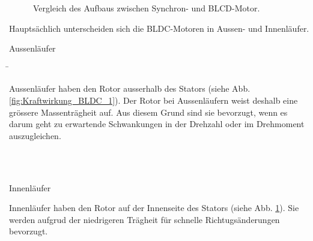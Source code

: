 \begin{figure}[h!]
\centering
\hspace{3cm}
%
\hfill
{}%
\hfill
\hspace{3cm}
\caption{Vergleich des Aufbaus zwischen Synchron- und BLCD-Motor.}
\label{fig:Aufbau_Synchron_und_BLDC}
\end{figure}

Hauptsächlich unterscheiden sich die BLDC-Motoren in Aussen- und Innenläufer.

\begin{tabbing}
\parbox[t]{.25\textwidth}{Aussenläufer} \= \parbox[t]{.75\textwidth}{Aussenläufer haben den Rotor ausserhalb des Stators (siehe Abb. \ref{fig:Kraftwirkung_BLDC_1}). Der Rotor bei Aussenläufern weist deshalb eine grössere Massenträgheit auf. Aus diesem Grund sind sie bevorzugt, wenn es darum geht zu erwartende Schwankungen in der Drehzahl oder im Drehmoment auszugleichen. \cite{bruner_burstenloser_2016} \cite{hembach_systematischer_2007}}\\
\\
\parbox[t]{.25\textwidth}{Innenläufer} \>\parbox[t]{.75\textwidth}{Innenläufer haben den Rotor auf der Innenseite des Stators (siehe Abb. \ref{fig:Aufbau_Synchron_und_BLDC}). Sie werden aufgrud der niedrigeren Trägheit für schnelle Richtugsänderungen bevorzugt.}
\end{tabbing}
\newpage

